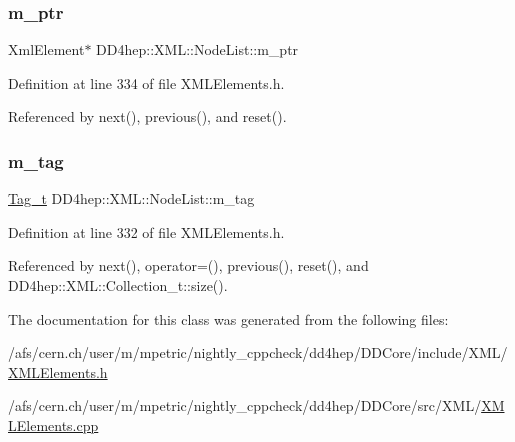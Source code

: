 \hypertarget{class_d_d4hep_1_1_x_m_l_1_1_node_list_ac57599e511cd4e3d6d8643eef39839c5}{}\label{class_d_d4hep_1_1_x_m_l_1_1_node_list_ac57599e511cd4e3d6d8643eef39839c5} 
\subsubsection{\texorpdfstring{m\+\_\+ptr}{m\_ptr}}
{\footnotesize\ttfamily Xml\+Element$\ast$ D\+D4hep\+::\+X\+M\+L\+::\+Node\+List\+::m\+\_\+ptr\hspace{0.3cm}{\ttfamily [mutable]}}



Definition at line 334 of file X\+M\+L\+Elements.\+h.



Referenced by next(), previous(), and reset().

\hypertarget{class_d_d4hep_1_1_x_m_l_1_1_node_list_ab375956d567e51de6da40c2ddbd3724d}{}\label{class_d_d4hep_1_1_x_m_l_1_1_node_list_ab375956d567e51de6da40c2ddbd3724d} 
\subsubsection{\texorpdfstring{m\+\_\+tag}{m\_tag}}
{\footnotesize\ttfamily \hyperlink{class_d_d4hep_1_1_x_m_l_1_1_tag__t}{Tag\+\_\+t} D\+D4hep\+::\+X\+M\+L\+::\+Node\+List\+::m\+\_\+tag}



Definition at line 332 of file X\+M\+L\+Elements.\+h.



Referenced by next(), operator=(), previous(), reset(), and D\+D4hep\+::\+X\+M\+L\+::\+Collection\+\_\+t\+::size().



The documentation for this class was generated from the following files\+:\begin{DoxyCompactItemize}
\item 
/afs/cern.\+ch/user/m/mpetric/nightly\+\_\+cppcheck/dd4hep/\+D\+D\+Core/include/\+X\+M\+L/\hyperlink{_x_m_l_elements_8h}{X\+M\+L\+Elements.\+h}\item 
/afs/cern.\+ch/user/m/mpetric/nightly\+\_\+cppcheck/dd4hep/\+D\+D\+Core/src/\+X\+M\+L/\hyperlink{_x_m_l_elements_8cpp}{X\+M\+L\+Elements.\+cpp}\end{DoxyCompactItemize}
